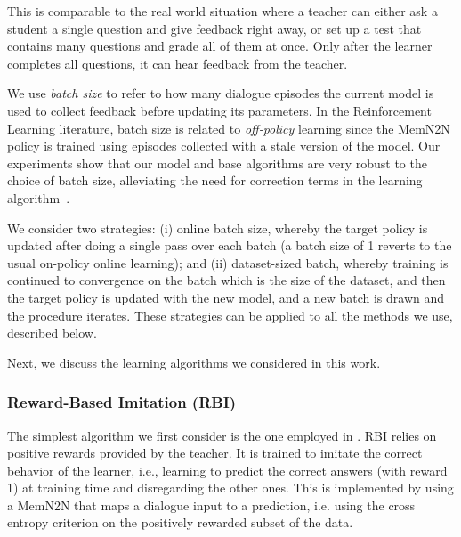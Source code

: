 This is comparable to the real world situation where a teacher can either ask a student a single question and give feedback right away,
or set up a test that contains many questions and grade all of them at once. Only after the learner completes all questions, it can hear
feedback from the teacher.

We use {\it batch size} to refer to how many dialogue
episodes the current model is used to collect feedback before updating its parameters.
In the Reinforcement Learning literature, batch size is related to {\em off-policy}
learning since the MemN2N policy is trained
using episodes collected with a stale version of the model. Our experiments show
that our model and base algorithms are very robust to the choice
of batch size, alleviating the need for correction terms in the learning algorithm~\citep{bottou-13}.

We consider two strategies: (i) online batch size, whereby the target policy is
updated after doing a single pass over each batch (a batch size of 1 reverts to
the usual on-policy online learning); and (ii) dataset-sized batch, whereby
training is continued to convergence on the batch which is the size of the dataset,
and then the target policy is updated with the new model, and a new batch is drawn and the procedure iterates.
These strategies can be applied to all the methods we use, described below.
%




Next, we discuss the learning algorithms we considered in this work.

\subsubsection{Reward-Based Imitation (RBI)}
The simplest algorithm we first consider is the one employed in .
RBI relies on positive rewards provided by the teacher.
It is trained to imitate the correct behavior of the learner, i.e.,
learning to predict the correct answers (with reward 1) at training time and disregarding the other ones.
This is implemented by using a {MemN2N} that maps a dialogue input to a prediction, i.e. 
using the cross entropy criterion on the positively rewarded subset of the data.

